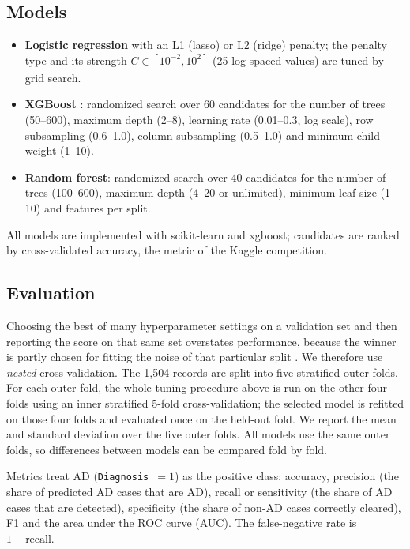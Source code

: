 \documentclass[11pt]{article}
\begin{document}
\subsection{Models}
\begin{itemize}
  \item \textbf{Logistic regression} with an L1 (lasso) or L2 (ridge) penalty; the penalty type and its
  strength $C \in [10^{-2}, 10^{2}]$ (25 log-spaced values) are tuned by grid search.
  \item \textbf{XGBoost} \citep{chen2016xgboost}: randomized search over 60 candidates for the number of
  trees (50--600), maximum depth (2--8), learning rate (0.01--0.3, log scale), row subsampling
  (0.6--1.0), column subsampling (0.5--1.0) and minimum child weight (1--10).
  \item \textbf{Random forest}: randomized search over 40 candidates for the number of trees (100--600),
  maximum depth (4--20 or unlimited), minimum leaf size (1--10) and features per split.
\end{itemize}
All models are implemented with scikit-learn \citep{pedregosa2011scikit} and xgboost; candidates are
ranked by cross-validated accuracy, the metric of the Kaggle competition.

\subsection{Evaluation}
Choosing the best of many hyperparameter settings on a validation set and then reporting the score on
that same set overstates performance, because the winner is partly chosen for fitting the noise of that
particular split \citep{varma2006bias, cawley2010overfitting}. We therefore use \emph{nested}
cross-validation. The 1,504 records are split into five stratified outer folds. For each outer fold, the
whole tuning procedure above is run on the other four folds using an inner stratified 5-fold
cross-validation; the selected model is refitted on those four folds and evaluated once on the held-out
fold. We report the mean and standard deviation over the five outer folds. All models use the same
outer folds, so differences between models can be compared fold by fold.

Metrics treat AD (\texttt{Diagnosis}~$=1$) as the positive class: accuracy, precision (the share of
predicted AD cases that are AD), recall or sensitivity (the share of AD cases that are detected),
specificity (the share of non-AD cases correctly cleared), F1 and the area under the ROC curve (AUC).
The false-negative rate is $1-\text{recall}$.
\end{document}
